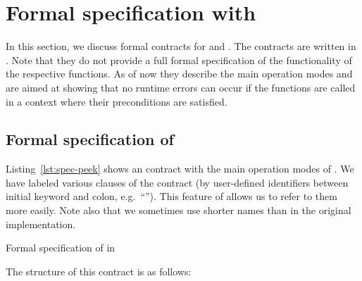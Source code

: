 \clearpage

\section{Formal specification with \acsl}
\label{sec:formal-specification}

In this section, we discuss formal contracts for \peek and \poke.
The contracts are written in \acsl.
Note that they do not provide a full formal specification
of the functionality of the respective functions.
As of now they describe the main operation modes and are aimed at showing
that no runtime errors can occur if the functions are called 
in a context where their preconditions are satisfied.

\subsection{Formal specification of \peek}
\label{sec:formal-specification-peek}

Listing~\ref{lst:spec-peek} shows an \acsl contract with the 
main operation modes of \peek.
We have labeled various clauses of the contract (by user-defined
identifiers between initial keyword and colon, e.g.\
``'').
This feature of \acsl allows us to refer to them more easily.
Note also that we sometimes use shorter names than in the original implementation.

\begin{listing}[hbt]
\begin{minipage}{\textwidth}

\end{minipage}
\caption{\label{lst:spec-peek} Formal specification of \peek in \acsl}
\end{listing}

The structure of this contract is as follows:


